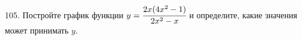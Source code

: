 105. Постройте график функции $y=\cfrac{2x(4x^2-1)}{2x^2-x}$ и определите, какие значения может принимать $y.$\\
